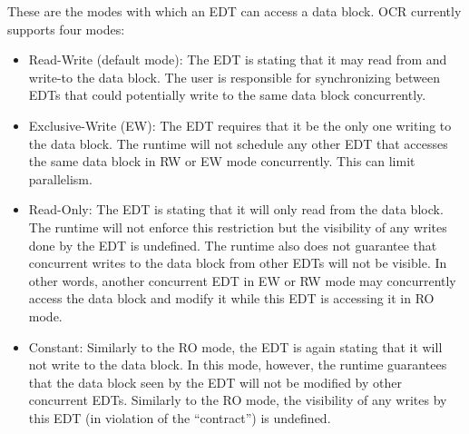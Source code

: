 These are the modes with which an EDT can access a data block.
OCR currently supports four modes:
\begin{itemize}
\item {} Read-Write (default mode): The EDT is stating that it
may read from and write-to the data block. The user is responsible for
synchronizing between EDTs that could potentially write to the same data block
concurrently.
\item {} Exclusive-Write (EW): The EDT requires that it be
the only one writing to the data block. The runtime will not schedule any other
EDT that accesses the same data block in RW or EW mode concurrently.
This can limit parallelism.
\item {} Read-Only: The EDT is stating that it will only read
from the data block. The runtime will not enforce this restriction but the
visibility of any writes done by the EDT is undefined. The runtime also does
not guarantee that concurrent writes to the data block from other EDTs
will not be visible. In other words, another concurrent EDT in EW or RW mode may
concurrently access the data block and modify it while this EDT is accessing it in
RO mode.
\item {} Constant: Similarly to the RO mode, the EDT is
again stating that it will not write to the data block. In this mode, however,
the runtime guarantees that the data block seen by the EDT will not be modified
by other concurrent EDTs. Similarly to the RO mode, the visibility of any writes
by this EDT (in violation of the ``contract'') is undefined.
\end{itemize}

